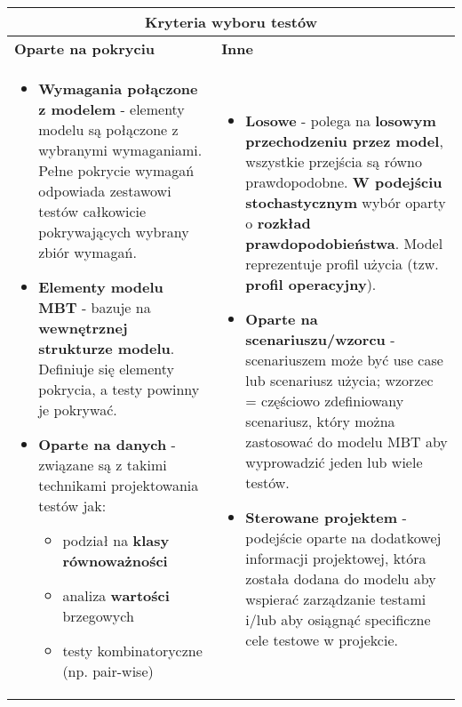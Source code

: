 \documentclass[../main.tex]{subfiles}
\begin{document}
    \begin{table}[H]
        \begin{center}
            \begin{tabular}{| p{8cm} | p{8cm} |}
                \hline
                \multicolumn{2}{|c|}{\textbf{Kryteria wyboru testów}}\\
                \hline
                \textbf{Oparte na pokryciu} & \textbf{Inne}\\
                \hline
                \begin{itemize}
                    \item \textbf{Wymagania połączone z modelem} - elementy modelu są połączone z wybranymi
                    wymaganiami. Pełne pokrycie wymagań odpowiada zestawowi testów całkowicie pokrywających wybrany zbiór wymagań.

                    \item \textbf{Elementy modelu MBT} - bazuje na \textbf{wewnętrznej strukturze modelu}. Definiuje się elementy
                    pokrycia, a testy powinny je pokrywać.

                    \item \textbf{Oparte na danych} - związane są z takimi technikami projektowania testów jak:
                    \begin{itemize}
                        \item podział na \textbf{klasy równoważności}
                        \item analiza \textbf{wartości} brzegowych
                        \item testy kombinatoryczne (np. pair-wise)
                    \end{itemize}
                \end{itemize}
                &
                \begin{itemize}
                    \item \textbf{Losowe} - polega na \textbf{losowym przechodzeniu przez model}, wszystkie przejścia są równo
                    prawdopodobne. \textbf{W podejściu stochastycznym} wybór oparty o \textbf{rozkład prawdopodobieństwa}. Model reprezentuje profil
                    użycia (tzw. \textbf{profil operacyjny}).
                    \item \textbf{Oparte na scenariuszu/wzorcu} - scenariuszem może być use case lub
                    scenariusz użycia; wzorzec = częściowo zdefiniowany scenariusz, który można
                    zastosować do modelu MBT aby wyprowadzić jeden lub wiele testów.
                    \item \textbf{Sterowane projektem} - podejście oparte na dodatkowej informacji projektowej, która została
                    dodana do modelu aby wspierać zarządzanie testami i/lub aby osiągnąć specificzne cele testowe w projekcie.
                \end{itemize}\\
                \hline
            \end{tabular}
        \end{center}
    \end{table}
\end{document}
